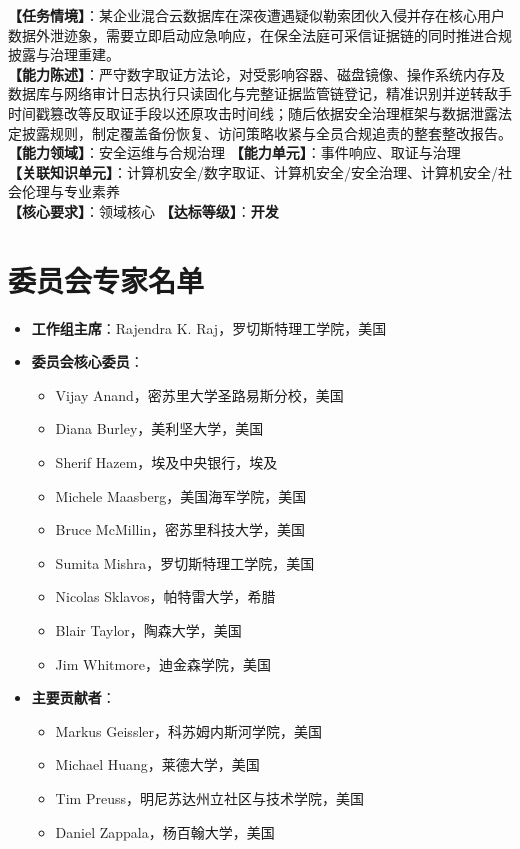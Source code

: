 \begin{taskbox}[任务 4：生产环境数据泄露事件数字取证溯源与安全治理整改]
\textbf{【任务情境】}：某企业混合云数据库在深夜遭遇疑似勒索团伙入侵并存在核心用户数据外泄迹象，需要立即启动应急响应，在保全法庭可采信证据链的同时推进合规披露与治理重建。\\
\textbf{【能力陈述】}：严守数字取证方法论，对受影响容器、磁盘镜像、操作系统内存及数据库与网络审计日志执行只读固化与完整证据监管链登记，精准识别并逆转敌手时间戳篡改等反取证手段以还原攻击时间线；随后依据安全治理框架与数据泄露法定披露规则，制定覆盖备份恢复、访问策略收紧与全员合规追责的整套整改报告。\\
\textbf{【能力领域】}：安全运维与合规治理 \quad \textbf{【能力单元】}：事件响应、取证与治理\\
\textbf{【关联知识单元】}：计算机安全/数字取证、计算机安全/安全治理、计算机安全/社会伦理与专业素养\\
\textbf{【核心要求】}：领域核心 \quad \textbf{【达标等级】}：\textbf{开发}
\end{taskbox}

\section{委员会专家名单}

\begin{itemize}\setlength{\itemsep}{0pt}\setlength{\parskip}{0pt}
    \item \textbf{工作组主席}：Rajendra K. Raj，罗切斯特理工学院，美国
    \item \textbf{委员会核心委员}：
    \begin{itemize}\setlength{\itemsep}{0pt}\setlength{\parskip}{0pt}
        \item Vijay Anand，密苏里大学圣路易斯分校，美国
        \item Diana Burley，美利坚大学，美国
        \item Sherif Hazem，埃及中央银行，埃及
        \item Michele Maasberg，美国海军学院，美国
        \item Bruce McMillin，密苏里科技大学，美国
        \item Sumita Mishra，罗切斯特理工学院，美国
        \item Nicolas Sklavos，帕特雷大学，希腊
        \item Blair Taylor，陶森大学，美国
        \item Jim Whitmore，迪金森学院，美国
    \end{itemize}
    \item \textbf{主要贡献者}：
    \begin{itemize}\setlength{\itemsep}{0pt}\setlength{\parskip}{0pt}
        \item Markus Geissler，科苏姆内斯河学院，美国
        \item Michael Huang，莱德大学，美国
        \item Tim Preuss，明尼苏达州立社区与技术学院，美国
        \item Daniel Zappala，杨百翰大学，美国
    \end{itemize}
\end{itemize}


